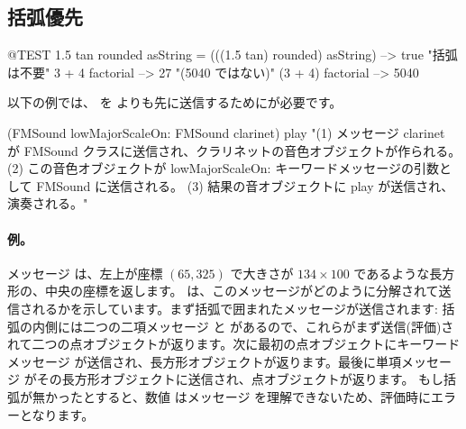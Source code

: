 \documentclass[a4paper,10pt,twoside]{book}
\begin{document}
\subsection{括弧優先}


\begin{code}{@TEST}
1.5 tan rounded asString = (((1.5 tan) rounded) asString) --> true    "括弧は不要"
3 + 4 factorial   --> 27    "(5040 ではない)"
(3 + 4) factorial --> 5040
\end{code}

以下の例では、 を  よりも先に送信するためにが必要です。
\begin{code}{}
(FMSound lowMajorScaleOn: FMSound clarinet) play 
"(1) メッセージ clarinet が FMSound クラスに送信され、クラリネットの音色オブジェクトが作られる。
 (2) この音色オブジェクトが lowMajorScaleOn: キーワードメッセージの引数として FMSound に送信される。
 (3) 結果の音オブジェクトに play が送信され、演奏される。"
\end{code}



\paragraph{例。}
メッセージ  は、左上が座標 $(65, 325)$ で大きさが $134{\times}100$ であるような長方形の、中央の座標を返します。 は、このメッセージがどのように分解されて送信されるかを示しています。まず括弧で囲まれたメッセージが送信されます: 括弧の内側には二つの二項メッセージ  と  があるので、これらがまず送信(評価)されて二つの点オブジェクトが返ります。次に最初の点オブジェクトにキーワードメッセージ  が送信され、長方形オブジェクトが返ります。最後に単項メッセージ  がその長方形オブジェクトに送信され、点オブジェクトが返ります。
もし括弧が無かったとすると、数値  はメッセージ  を理解できないため、評価時にエラーとなります。
\end{document}
